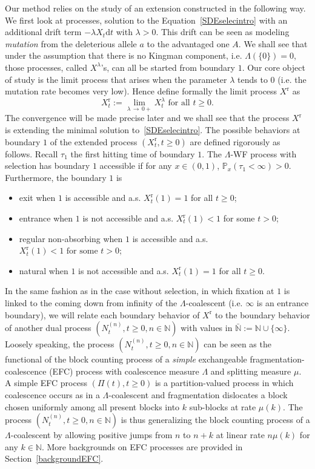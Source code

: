\documentclass[10pt]{amsart}
\theoremstyle{definition}\newtheorem{defi}[theo]{Definition}\newtheorem{rema}[theo]{Remark}\newtheorem{exam}[theo]{Example}\newtheorem{exem}[theo]{Example}\newtheorem{nota}[theo]{Notation}
\newcommand{\ddr}{\mathrm{d}}
\newcommand{\rmr}{\mathrm{r}}
\newcommand{\bbN}{\mathbb{N}}
\newcommand{\bbP}{\mathbb{P}}
\begin{document}
Our method relies on the study of an extension constructed in the following way. We first look at processes, solution to the Equation~\eqref{SDEselecintro} with an additional drift term $-\lambda X_t\ddr t$ with $\lambda>0$. This drift can be seen as modeling \emph{mutation} from the deleterious allele $a$ to the advantaged one $A$. We shall see that under the assumption that there is no Kingman component, i.e. $\Lambda(\{0\})=0$, those processes, called $X^{\lambda}$'s, can all be started from boundary $1$. Our core object of study is the limit process that arises when the parameter $\lambda$ tends to $0$ (i.e. the mutation rate becomes very low). Hence define formally the limit process $X^{\rmr}$ as
\[
X^{\rmr}_t:=\underset{\lambda\,\rightarrow\,0+}{\lim} X^{\lambda}_t \text{ for all } t\geq 0.
\]
The convergence will be made precise later and we shall see that the process $X^{\rmr}$ is extending the minimal solution to~\eqref{SDEselecintro}. The possible behaviors at boundary $1$ of the extended process $(X_t^{\rmr},t\geq 0)$ are defined rigorously as follows.
Recall $\tau_1$ the first hitting time of boundary $1$. The $\Lambda$-WF process with selection has boundary $1$ accessible if for any $x\in (0,1)$, $\bbP_x(\tau_1<\infty)>0$. Furthermore, the boundary $1$ is
\begin{itemize}
\item[-] exit when $1$ is accessible and a.s. $X^{\rmr}_t(1)=1$ for all $t\geq 0$;
\item[-] entrance when $1$ is not accessible and a.s. $X^{\rmr}_t(1)<1$ for some $t>0$;
\item[-] regular non-absorbing when $1$ is accessible and a.s. $X^{\rmr}_{t}(1)<1\text{ for some }t>0$;
\item[-] natural when $1$ is not accessible and a.s. $X_t^{\rmr}(1)=1$ for all $t\geq 0$.
\end{itemize}

In the same fashion as in the case without selection, in which fixation at $1$ is linked to the coming down from infinity of the $\Lambda$-coalescent (i.e. $\infty$ is an entrance boundary), we will relate each boundary behavior of $X^{\rmr}$ to the boundary behavior of another dual process $(N^{(n)}_t,t\geq 0,n\in \bbN)$ with values in $\bar{\bbN}:=\bbN\cup \{\infty\}$. Loosely speaking, the process $(N^{(n)}_t,t\geq 0,n\in \bbN)$ can be seen as the functional of the block counting process of a \emph{simple} exchangeable fragmentation-coalescence (EFC) process with coalescence measure $\Lambda$ and splitting measure $\mu$. A simple EFC process $(\Pi(t),t\geq 0)$ is a partition-valued process in which coalescence occurs as in a $\Lambda$-coalescent and fragmentation dislocates a block chosen uniformly among all present blocks into $k$ sub-blocks at rate $\mu(k)$. The process $(N^{(n)}_t,t\geq 0,n\in \bbN)$ is thus generalizing the block counting process of a $\Lambda$-coalescent by allowing positive jumps from $n$ to $n+k$ at linear rate $n\mu(k)$ for any $k\in \bbN$. More backgrounds on EFC processes are provided in Section~\ref{backgroundEFC}.
\end{document}
